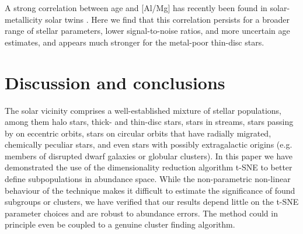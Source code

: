 \documentclass{aa}  %
\begin{document}
A strong correlation between age and [Al/Mg] has recently been found in solar-metallicity solar twins \citep{Nissen2015, Nissen2016, TucciMaia2016, Nissen2017}. Here we find that this correlation persists for a broader range of stellar parameters, lower signal-to-noise ratios, and more uncertain age estimates, and appears much stronger for the metal-poor thin-disc stars.


% 
% 
% 

\section{Discussion and conclusions}\label{conclusions}

The solar vicinity comprises a well-established mixture of stellar populations, among them halo stars, thick- and thin-disc stars, stars in streams, stars passing by on eccentric orbits, stars on circular orbits that have radially migrated, chemically peculiar stars, and even stars with possibly extragalactic origins (e.g. members of disrupted dwarf galaxies or globular clusters). 
In this paper we have demonstrated the use of the dimensionality reduction algorithm t-SNE to better define subpopulations in abundance space. While the non-parametric non-linear behaviour of the technique makes it difficult to estimate the significance of found subgroups or clusters, we have verified that our results depend little on the t-SNE parameter choices and are robust to abundance errors. The method could in principle even be coupled to a genuine cluster finding algorithm.
\end{document}

